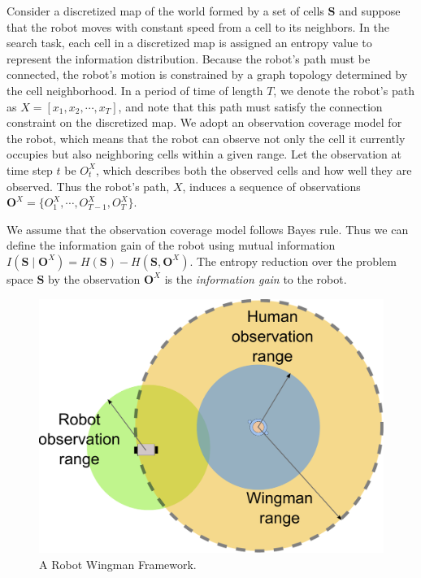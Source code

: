 \documentclass[phd]{byuprop}
\begin{document}
Consider a discretized map of the world formed by a set of cells $ \mathbf{S}$ and suppose that the robot moves with constant speed from a cell to its neighbors.
In the search task, each cell in a discretized map is assigned an entropy value to represent the information distribution.
Because the robot's path must be connected, the robot's motion is constrained by a graph topology determined by the cell neighborhood. 
In a period of time of length $ T $, we denote the robot's path as $ X = [x_{1}, x_{2} , \cdots , x_{T}] $, and note that this path must satisfy the connection constraint on the discretized map.
We adopt an observation coverage model for the robot, which means that the robot can observe not only the cell it currently occupies but also neighboring cells within a given range.
Let the observation at time step $ t $ be $ O^{X}_{t} $, which describes both the observed cells and how well they are observed.
Thus the robot's path, $X$, induces a sequence of observations $ \mathbf{O}^{X} = \{ O^{X}_{1}, \cdots , O^{X}_{T-1}, O^{X}_{T} \}$.

We assume that the observation coverage model follows Bayes rule.
Thus we can define the information gain of the robot using mutual information $ I( \mathbf{S} \mid \mathbf{O}^{X} ) =  H( \mathbf{S} ) - H( \mathbf{S}, \mathbf{O}^{X}  ) $.
The entropy reduction over the problem space $ \mathbf{S} $ by the observation $ \mathbf{O}^{X} $ is the {\em information gain} to the robot.

\begin{figure}[hbtp]
\centering
\includegraphics[width=0.4\linewidth]{./fig/Wingman.pdf}
\caption{A Robot Wingman Framework.}
\label{fig:Wingman}
\end{figure}
\end{document}
